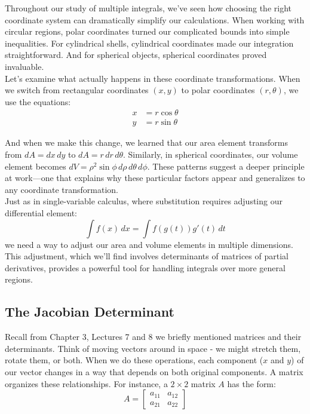 \newpage

 

\noindent Throughout our study of multiple integrals, we've seen how choosing the right coordinate system can dramatically simplify our calculations. When working with circular regions, polar coordinates turned our complicated bounds into simple inequalities. For cylindrical shells, cylindrical coordinates made our integration straightforward. And for spherical objects, spherical coordinates proved invaluable. \\

\noindent Let's examine what actually happens in these coordinate transformations. When we switch from rectangular coordinates $(x,y)$ to polar coordinates $(r,\theta)$, we use the equations:
\begin{align*}
x &= r\cos\theta \\
y &= r\sin\theta
\end{align*}

\noindent And when we make this change, we learned that our area element transforms from $dA = dx\,dy$ to $dA = r\,dr\,d\theta$. Similarly, in spherical coordinates, our volume element becomes $dV = \rho^2\sin\phi\,d\rho\,d\theta\,d\phi$. These patterns suggest a deeper principle at work—one that explains why these particular factors appear and generalizes to any coordinate transformation. \\

\noindent Just as in single-variable calculus, where substitution requires adjusting our differential element:
\[
\int f(x)\,dx = \int f(g(t))g'(t)\,dt
\]
we need a way to adjust our area and volume elements in multiple dimensions. This adjustment, which we'll find involves determinants of matrices of partial derivatives, provides a powerful tool for handling integrals over more general regions. 

\subsection*{The Jacobian Determinant} 

\noindent Recall from Chapter 3, Lectures 7 and 8 we briefly mentioned matrices and their determinants. Think of moving vectors around in space - we might stretch them, rotate them, or both. When we do these operations, each component ($x$ and $y$) of our vector changes in a way that depends on both original components. A matrix organizes these relationships. For instance, a $2 \times 2$ matrix $A$ has the form:  
\[
A = \begin{bmatrix}
a_{11} & a_{12} \\
a_{21} & a_{22}
\end{bmatrix}
\]


